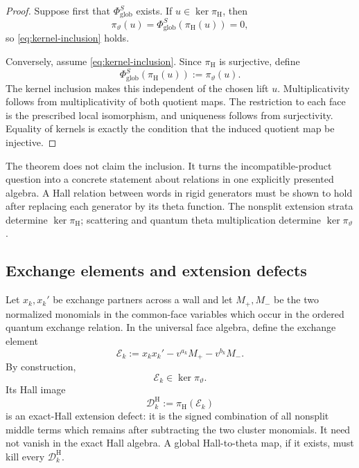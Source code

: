 \begin{proof}
Suppose first that $\Phi_{\mathrm{glob}}^S$ exists.  If
$u\in\ker\pi_{\mathrm H}$, then
\[
 \pi_\vartheta(u)
 =\Phi_{\mathrm{glob}}^S(\pi_{\mathrm H}(u))=0,
\]
so \cref{eq:kernel-inclusion} holds.

Conversely, assume \cref{eq:kernel-inclusion}.  Since $\pi_{\mathrm H}$ is
surjective, define
\[
 \Phi_{\mathrm{glob}}^S(\pi_{\mathrm H}(u)):=\pi_\vartheta(u).
\]
The kernel inclusion makes this independent of the chosen lift $u$.
Multiplicativity follows from multiplicativity of both quotient maps.  The
restriction to each face is the prescribed local isomorphism, and uniqueness
follows from surjectivity.  Equality of kernels is exactly the condition that
the induced quotient map be injective.
\end{proof}

\begin{remark}
The theorem does not claim the inclusion.  It turns the incompatible-product
question into a concrete statement about relations in one explicitly
presented algebra.  A Hall relation between words in rigid generators must be
shown to hold after replacing each generator by its theta function.  The
nonsplit extension strata determine $\ker\pi_{\mathrm H}$; scattering and
quantum theta multiplication determine $\ker\pi_\vartheta$.
\end{remark}

\subsection{Exchange elements and extension defects}

Let $x_k,x_k'$ be exchange partners across a wall and let
$M_+,M_-$ be the two normalized monomials in the common-face variables which
occur in the ordered quantum exchange relation.  In the universal face
algebra, define the exchange element
\begin{equation}
 \mathcal E_k
 :=x_kx_k'-v^{a_k}M_+-v^{b_k}M_-.
 \label{eq:exchange-element}
\end{equation}
By construction,
\[
 \mathcal E_k\in\ker\pi_\vartheta.
\]
Its Hall image
\begin{equation}
 \mathcal D_k^{\mathrm H}:=\pi_{\mathrm H}(\mathcal E_k)
 \label{eq:Hall-exchange-defect}
\end{equation}
is an exact-Hall extension defect: it is the signed combination of all
nonsplit middle terms which remains after subtracting the two cluster
monomials.  It need not vanish in the exact Hall algebra.  A global
Hall-to-theta map, if it exists, must kill every $\mathcal D_k^{\mathrm H}$.

